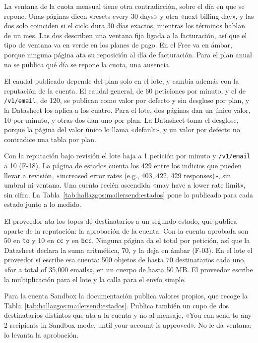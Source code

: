 La ventana de la cuota mensual tiene otra contradicción, sobre el día en que se
repone. Unas páginas dicen «resets every 30 days» y otra «next billing day», y las dos
solo coinciden si el ciclo dura 30 días exactos, mientras los términos hablan de un
mes. Las dos describen una ventana fija ligada a la facturación, así que el tipo de
ventana va en verde en los planes de pago. En el Free va en ámbar, porque ninguna
página ata su reposición al día de facturación. Para el plan anual no se publica qué
día se repone la cuota, una ausencia.

El caudal publicado depende del plan solo en el lote, y cambia además con la
reputación de la cuenta. El caudal general, de 60 peticiones por minuto, y el de
\texttt{/v1/email}, de 120, se publican como valor por defecto y sin desglose por
plan, y la Datasheet los aplica a los cuatro. Para el lote, dos páginas dan un único
valor, 10 por minuto, y otras dos dan uno por plan. La Datasheet toma el desglose,
porque la página del valor único lo llama «default», y un valor por defecto no
contradice una tabla por plan.

Con la reputación bajo revisión el lote baja a 1 petición por minuto y
\texttt{/v1/email} a 10 (F-18). La página de estados cuenta los 429 entre los indicios que pueden llevar a revisión,
«increased error rates (e.g., 403, 422, 429 responses)», sin umbral ni ventana. Una
cuenta recién ascendida «may have a lower rate limit», sin cifra. La
Tabla~\ref{tab:hallazgos:mailersend:estados} pone lo publicado para cada estado junto
a lo medido.

El proveedor ata los topes de destinatarios a un segundo estado, que publica aparte de
la reputación: la aprobación de la cuenta. Con la cuenta aprobada son 50
en \texttt{to} y 10 en \texttt{cc} y en \texttt{bcc}. Ninguna página da el total por petición,
así que la Datasheet declara la suma aritmética, 70, y la deja en ámbar (F-03). En el
lote el proveedor sí escribe esa cuenta: 500 objetos de hasta 70 destinatarios cada
uno, «for a total of 35,000 emails», en un cuerpo de hasta 50 MB. El proveedor escribe
la multiplicación para el lote y la calla para el envío simple.

Para la cuenta Sandbox la documentación publica valores propios, que recoge la
Tabla~\ref{tab:hallazgos:mailersend:estados}. Publica también un cupo de dos destinatarios distintos que ata a la cuenta y no al mensaje, «You can send
to any 2 recipients in Sandbox mode, until your account is approved». No le da
ventana: lo levanta la aprobación.

